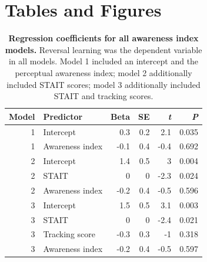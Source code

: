 \documentclass[12pt]{article}
\begin{document}
\section*{Tables and Figures}
\label{sec:org83a81bf}
\singlespacing
\begin{table}[htbp]
\centering
\begin{tabular}{rlrrrr}
\textbf{Model} & \textbf{Predictor} & \textbf{Beta} & \textbf{SE} & \textbf{\emph{t}} & \textbf{\emph{P}}\\
\hline
1 & Intercept & 0.3 & 0.2 & 2.1 & 0.035\\
1 & Awareness index & -0.1 & 0.4 & -0.4 & 0.692\\
2 & Intercept & 1.4 & 0.5 & 3 & 0.004\\
2 & STAIT & 0 & 0 & -2.3 & 0.024\\
2 & Awareness index & -0.2 & 0.4 & -0.5 & 0.596\\
3 & Intercept & 1.5 & 0.5 & 3.1 & 0.003\\
3 & STAIT & 0 & 0 & -2.4 & 0.021\\
3 & Tracking score & -0.3 & 0.3 & -1 & 0.318\\
3 & Awareness index & -0.2 & 0.4 & -0.5 & 0.597\\
\end{tabular}
\caption{\label{tab:org3572c3f}
\textbf{Regression coefficients for all awareness index models.} Reversal learning was the dependent variable in all models. Model 1 included an intercept and the perceptual awareness index; model 2 additionally included STAIT scores; model 3 additionally included STAIT and tracking scores.}

\end{table}
\end{document}
